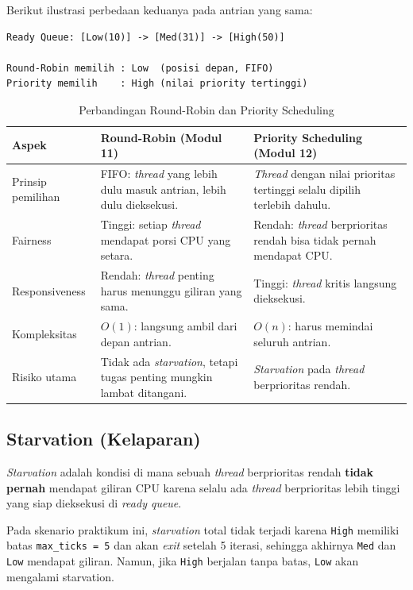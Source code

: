 Berikut ilustrasi perbedaan keduanya pada antrian yang sama:

\begin{lstlisting}[caption={Ilustrasi perbedaan pemilihan thread}]
Ready Queue: [Low(10)] -> [Med(31)] -> [High(50)]

Round-Robin memilih : Low  (posisi depan, FIFO)
Priority memilih    : High (nilai priority tertinggi)
\end{lstlisting}

\begin{table}[h]
	\centering
	\caption{Perbandingan Round-Robin dan Priority Scheduling}
	\label{tab:m12-perbandingan}
	\begin{tabulary}{\textwidth}{|L|L|L|}
		\hline
		\textbf{Aspek} & \textbf{Round-Robin (Modul 11)} & \textbf{Priority Scheduling (Modul 12)} \\ \hline
		Prinsip pemilihan
		& FIFO: \textit{thread} yang lebih dulu masuk antrian, lebih dulu dieksekusi.
		& \textit{Thread} dengan nilai prioritas tertinggi selalu dipilih terlebih dahulu. \\ \hline
		Fairness
		& Tinggi: setiap \textit{thread} mendapat porsi CPU yang setara.
		& Rendah: \textit{thread} berprioritas rendah bisa tidak pernah mendapat CPU. \\ \hline
		Responsiveness
		& Rendah: \textit{thread} penting harus menunggu giliran yang sama.
		& Tinggi: \textit{thread} kritis langsung dieksekusi. \\ \hline
		Kompleksitas
		& $O(1)$: langsung ambil dari depan antrian.
		& $O(n)$: harus memindai seluruh antrian. \\ \hline
		Risiko utama
		& Tidak ada \textit{starvation}, tetapi tugas penting mungkin lambat ditangani.
		& \textit{Starvation} pada \textit{thread} berprioritas rendah. \\ \hline
	\end{tabulary}
\end{table}

\subsection{Starvation (Kelaparan)}
\textit{Starvation} adalah kondisi di mana sebuah \textit{thread} berprioritas rendah \textbf{tidak pernah} mendapat giliran CPU karena selalu ada \textit{thread} berprioritas lebih tinggi yang siap dieksekusi di \textit{ready queue}.

Pada skenario praktikum ini, \textit{starvation} total tidak terjadi karena \texttt{High} memiliki batas \texttt{max\_ticks = 5} dan akan \textit{exit} setelah 5 iterasi, sehingga akhirnya \texttt{Med} dan \texttt{Low} mendapat giliran. Namun, jika \texttt{High} berjalan tanpa batas, \texttt{Low} akan mengalami starvation.

